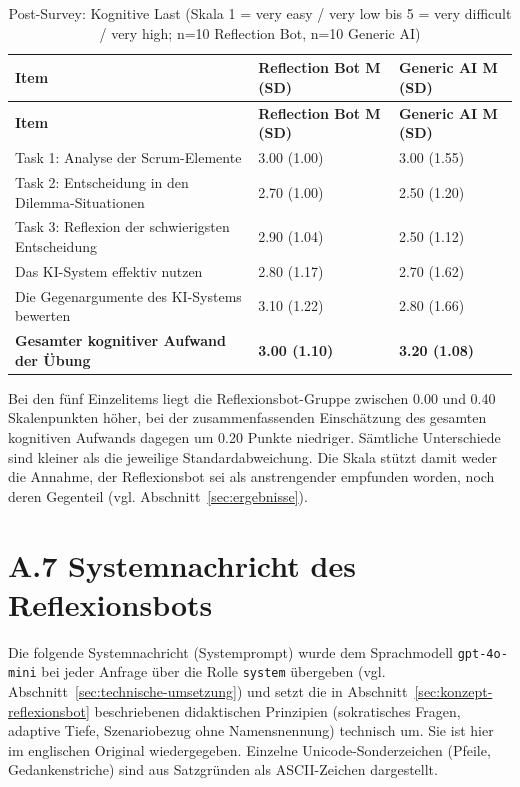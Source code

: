 \begingroup
\small
\setlength{\tabcolsep}{6pt}
\begin{longtable}{p{7.5cm} p{2.7cm} p{2.7cm}}
    \caption{Post-Survey: Kognitive Last (Skala 1 = very easy / very low bis 5 = very difficult /
    very high; n=10 Reflection Bot, n=10 Generic AI)}
    \label{tab:survey-kognitive-last} \\
    \toprule
    \textbf{Item} & \textbf{Reflection Bot M (SD)} & \textbf{Generic AI M (SD)} \\
    \midrule
    \endfirsthead
    \toprule
    \textbf{Item} & \textbf{Reflection Bot M (SD)} & \textbf{Generic AI M (SD)} \\
    \midrule
    \endhead
    \bottomrule
    \endfoot
    Task 1: Analyse der Scrum-Elemente & 3.00 (1.00) & 3.00 (1.55) \\
    Task 2: Entscheidung in den Dilemma-Situationen & 2.70 (1.00) & 2.50 (1.20) \\
    Task 3: Reflexion der schwierigsten Entscheidung & 2.90 (1.04) & 2.50 (1.12) \\
    Das KI-System effektiv nutzen & 2.80 (1.17) & 2.70 (1.62) \\
    Die Gegenargumente des KI-Systems bewerten & 3.10 (1.22) & 2.80 (1.66) \\
    \midrule
    \textbf{Gesamter kognitiver Aufwand der Übung} & \textbf{3.00 (1.10)} & \textbf{3.20 (1.08)} \\
\end{longtable}
\endgroup

Bei den fünf Einzelitems liegt die Reflexionsbot-Gruppe zwischen 0.00 und 0.40 Skalenpunkten höher,
bei der zusammenfassenden Einschätzung des gesamten kognitiven Aufwands dagegen um 0.20 Punkte
niedriger. Sämtliche Unterschiede sind kleiner als die jeweilige Standardabweichung. Die Skala stützt
damit weder die Annahme, der Reflexionsbot sei als anstrengender empfunden worden, noch deren
Gegenteil (vgl. Abschnitt~\ref{sec:ergebnisse}).

\newpage
\section*{A.7 Systemnachricht des Reflexionsbots}
\label{app:systemprompt}

Die folgende Systemnachricht (Systemprompt) wurde dem Sprachmodell \texttt{gpt-4o-mini} bei jeder
Anfrage über die Rolle \texttt{system} übergeben (vgl. Abschnitt~\ref{sec:technische-umsetzung}) und
setzt die in Abschnitt~\ref{sec:konzept-reflexionsbot} beschriebenen didaktischen Prinzipien
(sokratisches Fragen, adaptive Tiefe, Szenariobezug ohne Namensnennung) technisch um. Sie ist hier im
englischen Original wiedergegeben. Einzelne Unicode-Sonderzeichen (Pfeile, Gedankenstriche) sind aus
Satzgründen als ASCII-Zeichen dargestellt.

